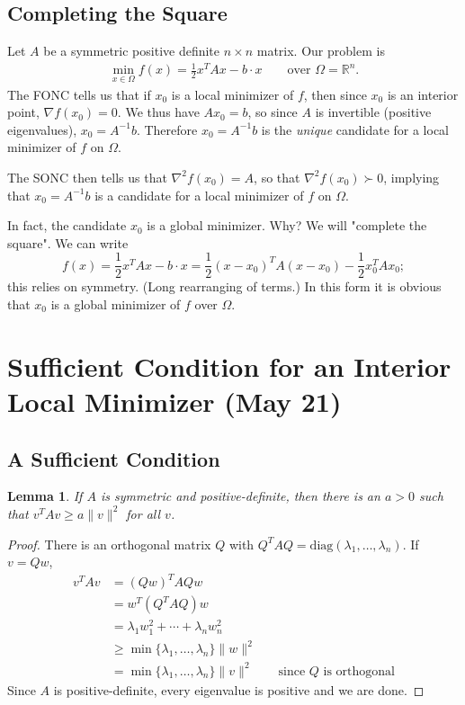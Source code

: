 \documentclass[11pt]{article}
\newcommand{\R}{\mathbb{R}}
\newtheorem{lemma}{Lemma}[subsection]
\begin{document}
\subsection{Completing the Square}

Let $A$ be a symmetric positive definite $n \times n$ matrix. Our problem is 
\begin{align*}
\min_{x \in \Omega} f(x) = \frac{1}{2} x^T Ax - b \cdot x \qquad \text{over } \Omega = \R^n.
\end{align*} 
The FONC tells us that if $x_0$ is a local minimizer of $f$, then since $x_0$ is an interior point, $\nabla f(x_0) = 0$. We thus have $Ax_0 = b$, so since $A$ is invertible (positive eigenvalues), $x_0 = A^{-1}b$. Therefore $x_0 = A^{-1}b$ is the \emph{unique} candidate for a local minimizer of $f$ on $\Omega$.


The SONC then tells us that $\nabla^2 f(x_0) = A$, so that $\nabla^2 f(x_0) \succ 0$, implying that $x_0   = A^{-1}b$ is a candidate for a local minimizer of $f$ on $\Omega$.

In fact, the candidate $x_0$ is a global minimizer. Why? We will "complete the square". We can write
\[
f(x) = 	\frac{1}{2} x^T Ax - b \cdot x = \frac{1}{2}(x - x_0)^T A(x-x_0) - \frac{1}{2} x_0^T A x_0;
\]
this relies on symmetry. (Long rearranging of terms.) In this form it is obvious that $x_0$ is a global minimizer of $f$ over $\Omega$.

\newpage


\section{Sufficient Condition for an Interior Local Minimizer (May 21)}

\subsection{A Sufficient Condition}
\begin{lemma} 
If $A$ is symmetric and positive-definite, then  there is an $a > 0$ such that $v^T A v \geq a \|v\|^2$ for all $v$.
\end{lemma}
\begin{proof}
There is an orthogonal matrix $Q$ with $Q^T A Q = \mathrm{diag}(\lambda_1, \dots, \lambda_n)$. If $v = Qw$,
\begin{align*}
v^T A v &= (Qw)^T A Qw \\
&= w^T (Q^T A Q) w \\
&= \lambda_1 w_1^2 + \cdots + \lambda_n w_n^2 \\
&\geq \min\{\lambda_1, \dots, \lambda_n\} \|w\|^2 \\
&= \min\{\lambda_1, \dots, \lambda_n\} \|v\|^2 \qquad \text{since $Q$ is orthogonal}
\end{align*}
Since $A$ is positive-definite, every eigenvalue is positive and we are done.
\end{proof}
\end{document}
